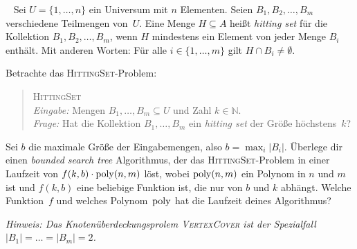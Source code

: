 \documentclass{uebung_cs}
\begin{document}
\begin{exercise}\
	Sei $U = \{1,\dots,n\}$ ein Universum mit $n$ Elementen.
	Seien $B_1,B_2,\dots,B_m$ verschiedene Teilmengen von~$U$.
	Eine Menge $H \subseteq A$ heißt \emph{hitting set} für die Kollektion $B_1,B_2,\dots,B_m$, wenn $H$ mindestens ein Element von jeder Menge $B_i$ enthält. Mit anderen Worten: Für alle $i \in \{1,\dots,m\}$ gilt $H \cap B_i \neq \emptyset$.

	Betrachte das \textsc{HittingSet}-Problem:
	\begin{quote}
		\textsc{HittingSet}\\
		\emph{Eingabe:} Mengen $B_1,\dots,B_m\subseteq U$ und Zahl $k\in \mathbb N$.\\
		\emph{Frage:} Hat die Kollektion $B_1,\dots,B_m$ ein \textit{hitting set} der Größe höchstens~$k$?
	\end{quote}

	Sei $b$ die maximale Größe der Eingabemengen, also $b=\max_i|B_i|$.
	Überlege dir einen \textit{bounded search tree} Algorithmus, der das \textsc{HittingSet}-Problem in einer Laufzeit von $f(k,b) \cdot \operatorname{poly}(n,m)$ löst, wobei $\operatorname{poly}(n,m)$ ein Polynom in $n$ und $m$ ist und $f(k,b)$ eine beliebige Funktion ist, die nur von $b$ und $k$ abhängt.
	Welche Funktion~$f$ und welches Polynom~$\operatorname{poly}$ hat die Laufzeit deines Algorithmus?

	\textit{Hinweis: Das Knotenüberdeckungsprolem \textsc{\upshape VertexCover} ist der Spezialfall $|B_1|=\dots=|B_m|=2$.}
\end{exercise}
\end{document}
